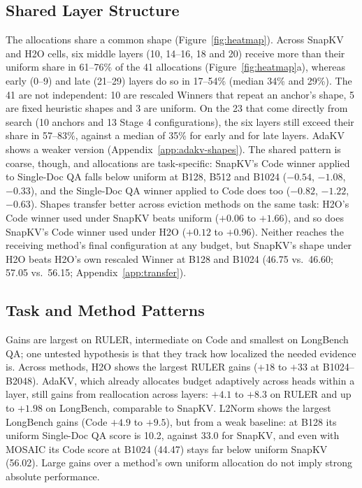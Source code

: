 \documentclass[11pt]{article}
\begin{document}
\subsection{Shared Layer Structure}
\label{sec:shared}

The allocations share a common shape (Figure~\ref{fig:heatmap}). Across SnapKV and H2O cells, six middle layers (10, 14--16, 18 and 20) receive more than their uniform share in 61--76\% of the 41 allocations (Figure~\ref{fig:heatmap}a), whereas early (0--9) and late (21--29) layers do so in 17--54\% (median 34\% and 29\%). The 41 are not independent: 10 are rescaled Winners that repeat an anchor's shape, 5 are fixed heuristic shapes and 3 are uniform. On the 23 that come directly from search (10 anchors and 13 Stage 4 configurations), the six layers still exceed their share in 57--83\%, against a median of 35\% for early and for late layers. AdaKV shows a weaker version (Appendix~\ref{app:adakv-shapes}). The shared pattern is coarse, though, and allocations are task-specific: SnapKV's Code winner applied to Single-Doc QA falls below uniform at B128, B512 and B1024 ($-0.54$, $-1.08$, $-0.33$), and the Single-Doc QA winner applied to Code does too ($-0.82$, $-1.22$, $-0.63$). Shapes transfer better across eviction methods on the same task: H2O's Code winner used under SnapKV beats uniform ($+0.06$ to $+1.66$), and so does SnapKV's Code winner used under H2O ($+0.12$ to $+0.96$). Neither reaches the receiving method's final configuration at any budget, but SnapKV's shape under H2O beats H2O's own rescaled Winner at B128 and B1024 (46.75 vs.\ 46.60; 57.05 vs.\ 56.15; Appendix~\ref{app:transfer}).

\subsection{Task and Method Patterns}

Gains are largest on RULER, intermediate on Code and smallest on LongBench QA; one untested hypothesis is that they track how localized the needed evidence is. Across methods, H2O shows the largest RULER gains ($+18$ to $+33$ at B1024--B2048). AdaKV, which already allocates budget adaptively across heads within a layer, still gains from reallocation across layers: $+4.1$ to $+8.3$ on RULER and up to $+1.98$ on LongBench, comparable to SnapKV. L2Norm shows the largest LongBench gains (Code $+4.9$ to $+9.5$), but from a weak baseline: at B128 its uniform Single-Doc QA score is 10.2, against 33.0 for SnapKV, and even with MOSAIC its Code score at B1024 (44.47) stays far below uniform SnapKV (56.02). Large gains over a method's own uniform allocation do not imply strong absolute performance.
\end{document}
